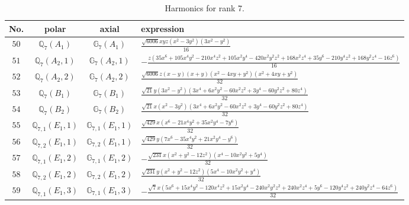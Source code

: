 \documentclass[fleqn,8pt,landscape]{jsarticle}
\begin{document}
\begin{table}[ht!]
\begin{center}
\caption{Harmonics for rank 7.}
\renewcommand{\arraystretch}{1.3}
\begin{tabular}{cccl} \hline \hline
No. & polar & axial & expression \\ \hline
$ 50 $ & $ \mathbb{Q}_{7}(A_{1}) $ & $ \mathbb{G}_{7}(A_{1}) $ & $ \frac{\sqrt{6006} x y z \left(x^{2} - 3 y^{2}\right) \left(3 x^{2} - y^{2}\right)}{16} $ \\
$ 51 $ & $ \mathbb{Q}_{7}(A_{2},1) $ & $ \mathbb{G}_{7}(A_{2},1) $ & $ - \frac{z \left(35 x^{6} + 105 x^{4} y^{2} - 210 x^{4} z^{2} + 105 x^{2} y^{4} - 420 x^{2} y^{2} z^{2} + 168 x^{2} z^{4} + 35 y^{6} - 210 y^{4} z^{2} + 168 y^{2} z^{4} - 16 z^{6}\right)}{16} $ \\
$ 52 $ & $ \mathbb{Q}_{7}(A_{2},2) $ & $ \mathbb{G}_{7}(A_{2},2) $ & $ \frac{\sqrt{6006} z \left(x - y\right) \left(x + y\right) \left(x^{2} - 4 x y + y^{2}\right) \left(x^{2} + 4 x y + y^{2}\right)}{32} $ \\
$ 53 $ & $ \mathbb{Q}_{7}(B_{1}) $ & $ \mathbb{G}_{7}(B_{1}) $ & $ \frac{\sqrt{21} y \left(3 x^{2} - y^{2}\right) \left(3 x^{4} + 6 x^{2} y^{2} - 60 x^{2} z^{2} + 3 y^{4} - 60 y^{2} z^{2} + 80 z^{4}\right)}{32} $ \\
$ 54 $ & $ \mathbb{Q}_{7}(B_{2}) $ & $ \mathbb{G}_{7}(B_{2}) $ & $ \frac{\sqrt{21} x \left(x^{2} - 3 y^{2}\right) \left(3 x^{4} + 6 x^{2} y^{2} - 60 x^{2} z^{2} + 3 y^{4} - 60 y^{2} z^{2} + 80 z^{4}\right)}{32} $ \\
$ 55 $ & $ \mathbb{Q}_{7,1}(E_{1},1) $ & $ \mathbb{G}_{7,1}(E_{1},1) $ & $ \frac{\sqrt{429} x \left(x^{6} - 21 x^{4} y^{2} + 35 x^{2} y^{4} - 7 y^{6}\right)}{32} $ \\
$ 56 $ & $ \mathbb{Q}_{7,2}(E_{1},1) $ & $ \mathbb{G}_{7,2}(E_{1},1) $ & $ \frac{\sqrt{429} y \left(7 x^{6} - 35 x^{4} y^{2} + 21 x^{2} y^{4} - y^{6}\right)}{32} $ \\
$ 57 $ & $ \mathbb{Q}_{7,1}(E_{1},2) $ & $ \mathbb{G}_{7,1}(E_{1},2) $ & $ - \frac{\sqrt{231} x \left(x^{2} + y^{2} - 12 z^{2}\right) \left(x^{4} - 10 x^{2} y^{2} + 5 y^{4}\right)}{32} $ \\
$ 58 $ & $ \mathbb{Q}_{7,2}(E_{1},2) $ & $ \mathbb{G}_{7,2}(E_{1},2) $ & $ \frac{\sqrt{231} y \left(x^{2} + y^{2} - 12 z^{2}\right) \left(5 x^{4} - 10 x^{2} y^{2} + y^{4}\right)}{32} $ \\
$ 59 $ & $ \mathbb{Q}_{7,1}(E_{1},3) $ & $ \mathbb{G}_{7,1}(E_{1},3) $ & $ - \frac{\sqrt{7} x \left(5 x^{6} + 15 x^{4} y^{2} - 120 x^{4} z^{2} + 15 x^{2} y^{4} - 240 x^{2} y^{2} z^{2} + 240 x^{2} z^{4} + 5 y^{6} - 120 y^{4} z^{2} + 240 y^{2} z^{4} - 64 z^{6}\right)}{32} $ \\

\end{tabular}
\end{center}
\end{table}
\end{document}
